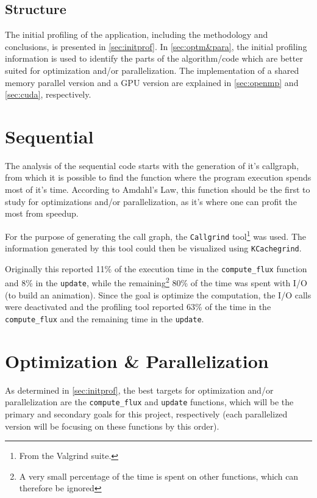 \documentclass[9pt,twocolumn]{scrartcl}
\begin{document}
\subsection{Structure}%
The initial profiling of the application, including the methodology and conclusions, is presented in \autoref{sec:initprof}. In \autoref{sec:optm&para}, the initial profiling information is used to identify the parts of the algorithm/code which are better suited for optimization and/or parallelization. The implementation of a shared memory parallel version and a GPU version are explained in \autoref{sec:openmp}  and \autoref{sec:cuda}, respectively.

\section{Sequential}%
\label{sec:initprof}
The analysis of the sequential code starts with the generation of it's callgraph, from which it is possible to find the function where the program execution spends most of it's time. According to Amdahl's Law, this function should be the first to study for optimizations and/or parallelization, as it's where one can profit the most from speedup.

For the purpose of generating the call graph, the \texttt{Callgrind} tool\footnote{From the Valgrind suite.} was used. The information generated by this tool could then be visualized using \texttt{KCachegrind}.

Originally this reported 11\% of the execution time in the \texttt{compute\_flux} function and 8\% in the \texttt{update}, while the remaining\footnote{A very small percentage of the time is spent on other functions, which can therefore be ignored} 80\% of the time was spent with I/O (to build an animation). Since the goal is optimize the computation, the I/O calls were deactivated and the profiling tool reported 63\% of the time in the \texttt{compute\_flux} and the remaining time in the \texttt{update}.

\section{Optimization \& Parallelization}
\label{sec:optm&para}
As determined in \autoref{sec:initprof}, the best targets for optimization and/or parallelization are the \texttt{compute\_flux} and \texttt{update} functions, which will be the primary and secondary goals for this project, respectively (each parallelized version will be focusing on these functions by this order).
\end{document}
